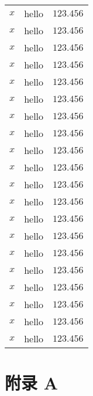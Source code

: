 \documentclass[UTF8]{report}
\theoremstyle{MyLineTheoremStyle} %
\theoremstyle{MyBlockTheoremStyle} %
\theoremstyle{MySubsubsectionStyle} %
\begin{document}
\begin{longtable}[c]{ccc}
     $x$ & hello  & $123.456$ \\
     $x$ & hello  & $123.456$ \\
     $x$ & hello  & $123.456$ \\
     $x$ & hello  & $123.456$ \\
     $x$ & hello  & $123.456$ \\
     $x$ & hello  & $123.456$ \\
     $x$ & hello  & $123.456$ \\
     $x$ & hello  & $123.456$ \\
     $x$ & hello  & $123.456$ \\
     $x$ & hello  & $123.456$ \\
     $x$ & hello  & $123.456$ \\
     $x$ & hello  & $123.456$ \\
     $x$ & hello  & $123.456$ \\
     $x$ & hello  & $123.456$ \\
     $x$ & hello  & $123.456$ \\
     $x$ & hello  & $123.456$ \\
     $x$ & hello  & $123.456$ \\
     $x$ & hello  & $123.456$ \\
     $x$ & hello  & $123.456$ \\
     $x$ & hello  & $123.456$ \\* \bottomrule
\end{longtable}



\nocite{*}

\thispagestyle{fancy} 




\newpage
\appendix
\titleformat{\chapter}[hang]{\normalfont\huge\bfseries\centering}{}{20pt}{\thechapter}
\titleformat{\section}{\large\centering\bfseries}{\thesection}{1em}{}
\titleformat{\subsection}{\normalsize\bfseries}{\thesubsection}{1em}{}

\chapter*{附录 A}
\end{document}
